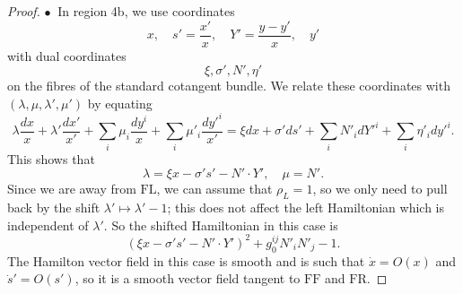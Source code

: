 \documentclass[10pt, a4paper, twoside]{amsart}
\numberwithin{equation}{section}
\theoremstyle{remark}
\begin{document}
\begin{proof}
$\bullet \ $ In region 4b, we use coordinates
$$
x, \quad s' = \frac{x'}{x}, \quad Y' = \frac{y-y'}{x}, \quad y'
$$
with dual coordinates
$$
\xi, \sigma', N', \eta'
$$
on the fibres of the standard cotangent bundle.
We relate these coordinates with $(\lambda, \mu, \lambda', \mu')$ by equating
$$
\lambda \frac{dx}{x} + \lambda' \frac{dx'}{x'} + \sum_i \mu_i \frac{dy^i}{x} + \sum_i \mu'_i \frac{{dy'}^i}{x'}=
\xi dx + \sigma' ds'  + \sum_i N'_i d{Y'}^i+ \sum_i \eta'_i {dy'}^i .
$$
This shows that
$$
\lambda = \xi x - \sigma' s' - N' \cdot Y', \quad \mu = N' .
$$
Since we are away from ${\mathrm{FL}}$, we can assume that $\rho_L= 1$,
so we only need to pull back by the shift $\lambda' \mapsto \lambda' - 1$; this does not affect the left Hamiltonian which is independent of $\lambda'$. So the shifted Hamiltonian in this case is
$$
(\xi x - \sigma' s' - N' \cdot Y')^2 + g_0^{ij} N'_i N'_j - 1.
$$
The Hamilton vector field in this case is smooth and is such that $\dot x = O(x)$ and $\dot s' = O(s')$, so it is a smooth vector field tangent to ${\mathrm{FF}}$ and ${\mathrm{FR}}$.


\end{proof}
\end{document}

